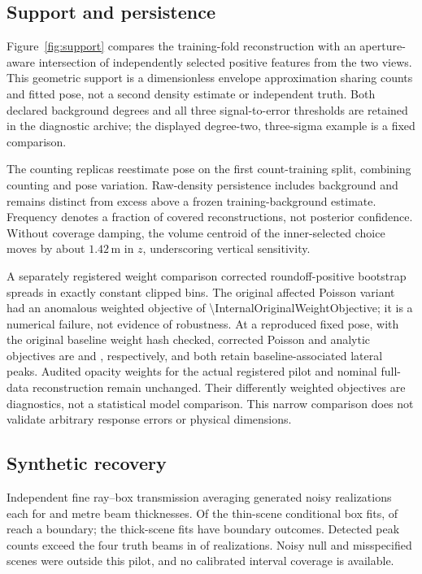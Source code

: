 \subsection{Support and persistence}
Figure~\ref{fig:support} compares the training-fold reconstruction with an aperture-aware intersection of independently selected positive features from the two views. This geometric support is a dimensionless envelope approximation sharing counts and fitted pose, not a second density estimate or independent truth. Both declared background degrees and all three signal-to-error thresholds are retained in the diagnostic archive; the displayed degree-two, three-sigma example is a fixed comparison.

The \InternalCountReplicas{} counting replicas reestimate pose on the first count-training split, combining counting and pose variation. Raw-density persistence includes background and remains distinct from excess above a frozen training-background estimate. Frequency denotes a fraction of covered reconstructions, not posterior confidence. Without coverage damping, the volume centroid of the inner-selected choice moves by about $1.42\,\mathrm{m}$ in $z$, underscoring vertical sensitivity.

A separately registered weight comparison corrected roundoff-positive bootstrap spreads in exactly constant clipped bins. The original affected Poisson variant had an anomalous weighted objective of \num{\InternalOriginalWeightObjective}; it is a numerical failure, not evidence of robustness. At a reproduced fixed pose, with the original baseline weight hash checked, corrected Poisson and analytic objectives are \InternalCorrectedPoissonObjective{} and \InternalCorrectedAnalyticObjective{}, respectively, and both retain \InternalCorrectedWeightPeaks{} baseline-associated lateral peaks. Audited opacity weights for the actual registered pilot and nominal full-data reconstruction remain unchanged. Their differently weighted objectives are diagnostics, not a statistical model comparison. This narrow comparison does not validate arbitrary response errors or physical dimensions.

\subsection{Synthetic recovery}
Independent fine ray--box transmission averaging generated \InternalThinReplicas{} noisy realizations each for \InternalThinTruthThickness{} and \InternalThickTruthThickness{} metre beam thicknesses. Of the thin-scene conditional box fits, \InternalThinBoundary{} of \InternalThinReplicas{} reach a boundary; the thick-scene fits have \InternalThickBoundary{} boundary outcomes. Detected peak counts exceed the four truth beams in \InternalExcessPeakOutcomes{} of \InternalRecoveryOutcomes{} realizations. Noisy null and misspecified scenes were outside this pilot, and no calibrated interval coverage is available.

